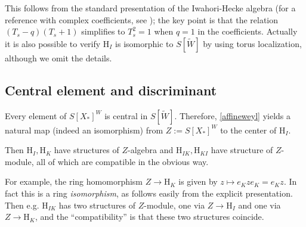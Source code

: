 \documentclass[10pt]{amsart}
\theoremstyle{remark}
\begin{document}
This follows from the standard presentation of the Iwahori-Hecke algebra (for a reference
with complex coefficients, see \cite[Theorem 4.2]{ChrissGinzburg}); the key point
is that the relation $(T_s-q)(T_s+1)$ simplifies to $T_s^2=1$ when $q=1$ in the coefficients.  
 Actually it is also possible to verify $\mathrm{H}_I$ is isomorphic to $S[\tilde{W}]$ by using torus localization,
although we omit the details.
%
%
%



\subsection{Central element and discriminant} \label{Zdis} 
Every element of $S[X_*]^W$ is central  in $S[\tilde{W}]$. Therefore, \eqref{affineweyl} yields 
a  natural map (indeed an isomorphism) from $Z := S[X_*]^W$ to the center of $\mathrm{H}_I$.  
 
Then $\mathrm{H}_I, \mathrm{H}_K$ have structures of $Z$-algebra and $\mathrm{H}_{IK}, \mathrm{H}_{KI}$
have structure of $Z$-module, all of which are compatible in the obvious way. 

For example, the  ring homomorphism $Z \rightarrow \mathrm{H}_K$
is given by $z \mapsto e_K z e_K = e_K z$. In fact this is a ring {\em isomorphism}, as follows easily from the explicit presentation.
Then e.g. $\mathrm{H}_{IK}$ has two structures of $Z$-module, one via $Z \rightarrow \mathrm{H}_I$ and one via
$Z \rightarrow \mathrm{H}_K$, and the ``compatibility'' is that these two structures coincide. 
 
\end{document}
